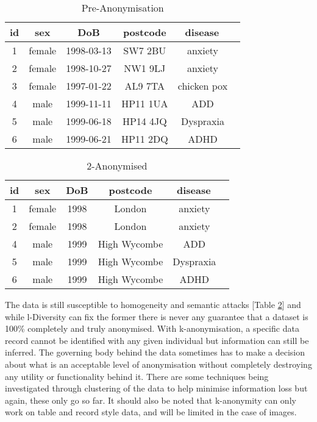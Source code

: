 \begin{center}
    \begin{longtable}{ |c|c|c|c|c| }
    \caption{Pre-Anonymisation}
    \label{tbl:pre-anon}
    \hline
    \textbf{id} & \textbf{sex} & \textbf{DoB} & \textbf{postcode} & \textbf{disease} \ \\ \hline
    1 & female & 1998-03-13 & SW7 2BU & anxiety \ \\ \hline
    2 & female & 1998-10-27 & NW1 9LJ & anxiety \ \\ \hline
    3 & female & 1997-01-22 & AL9 7TA & chicken pox \ \\ \hline
    4 & male & 1999-11-11 & HP11 1UA & ADD \ \\ \hline
    5 & male & 1999-06-18 & HP14 4JQ & Dyspraxia \ \\ \hline
    6 & male & 1999-06-21 & HP11 2DQ & ADHD \ \\ \hline
    \end{longtable}
    
    \begin{longtable}{ |c|c|c|c|c| }
    \caption{2-Anonymised}
    \label{tbl:2-anon}
    \hline
    \textbf{id} & \textbf{sex} & \textbf{DoB} & \textbf{postcode} & \textbf{disease} \ \\ \hline
    \rowcolor{lightgray} 1 & female & 1998 & London & anxiety \ \\ \hline
    \rowcolor{lightgray} 2 & female & 1998 & London & anxiety \ \\ \hline
    \rowcolor{gray} 4 & male & 1999 & High Wycombe & ADD \ \\ \hline
    \rowcolor{gray} 5 & male & 1999 & High Wycombe & Dyspraxia \ \\ \hline
    \rowcolor{gray} 6 & male & 1999 & High Wycombe & ADHD \ \\ \hline
    \end{longtable}
\end{center}

The data is still susceptible to homogeneity and semantic attacks [Table \ref{tbl:2-anon}] and while {l-Diversity} can fix the former there is never any guarantee that a dataset is 100\% completely and truly anonymised. With k-anonymisation, a specific data record cannot be identified with any given individual but information can still be inferred. The governing body behind the data sometimes has to make a decision about what is an acceptable level of anonymisation without completely destroying any utility or functionality behind it. There are some techniques being investigated through clustering of the data to help minimise information loss \cite{anon_cluster} but again, these only go so far. It should also be noted that k-anonymity can only work on table and record style data, and will be limited in the case of images.


